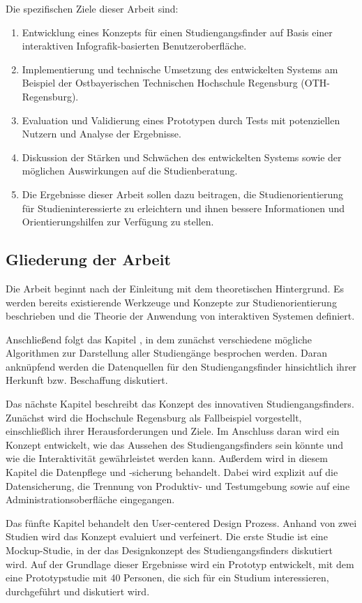 \noindent
Die spezifischen Ziele dieser Arbeit sind:
\begin{enumerate}
\item Entwicklung eines Konzepts für einen Studiengangsfinder auf Basis einer
interaktiven Infografik-basierten Benutzeroberfläche.
\item Implementierung und technische Umsetzung des entwickelten Systems am
Beispiel der Ostbayerischen Technischen Hochschule Regensburg (OTH-Regensburg).
\item Evaluation und Validierung eines Prototypen durch Tests mit potenziellen
Nutzern und Analyse der Ergebnisse.
\item Diskussion der Stärken und Schwächen des entwickelten Systems sowie der
möglichen Auswirkungen auf die Studienberatung.
\item Die Ergebnisse dieser Arbeit sollen dazu beitragen, die
Studienorientierung für Studieninteressierte zu erleichtern und ihnen bessere
Informationen und Orientierungshilfen zur Verfügung zu stellen.
\end{enumerate}

\subsection{Gliederung der Arbeit}
Die Arbeit beginnt nach der Einleitung mit dem theoretischen Hintergrund. Es werden bereits existierende Werkzeuge und Konzepte zur Studienorientierung beschrieben und die Theorie der Anwendung von interaktiven Systemen definiert.

Anschließend folgt das Kapitel , in dem zunächst verschiedene mögliche Algorithmen zur Darstellung aller Studiengänge besprochen werden. Daran anknüpfend werden die Datenquellen für den Studiengangsfinder hinsichtlich ihrer Herkunft bzw. Beschaffung diskutiert.

Das nächste Kapitel beschreibt das Konzept des innovativen Studiengangsfinders. Zunächst wird die Hochschule Regensburg als Fallbeispiel vorgestellt, einschließlich ihrer Herausforderungen und Ziele. Im Anschluss daran wird ein Konzept entwickelt, wie das Aussehen des Studiengangsfinders sein könnte und wie die Interaktivität gewährleistet werden kann. Außerdem wird in diesem Kapitel die Datenpflege und -sicherung behandelt. Dabei wird explizit auf die Datensicherung, die Trennung von Produktiv- und Testumgebung sowie auf eine Administrationsoberfläche eingegangen.

Das fünfte Kapitel behandelt den User-centered Design Prozess. Anhand von zwei Studien wird das Konzept evaluiert und verfeinert. Die erste Studie ist eine Mockup-Studie, in der das Designkonzept des Studiengangsfinders diskutiert wird. Auf der Grundlage dieser Ergebnisse wird ein Prototyp entwickelt, mit dem eine Prototypstudie mit 40 Personen, die sich für ein Studium interessieren, durchgeführt und diskutiert wird.

